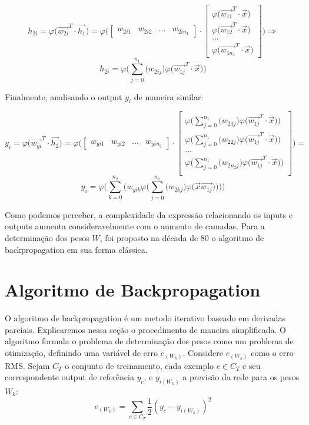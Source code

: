 \documentclass[
	12pt,				%
	oneside,			%
	a4paper,			%
	english,			%
	french,				%
	spanish,			%
	brazil,				%
	]{abntex2}
\begin{document}
$$h_{2i} = \varphi \big( \vec{w_{2i}}^T \cdot \vec{h_1}  ) = 
\varphi \bigg(
\begin{bmatrix}
w_{2i1} & w_{2i2} & ... & w_{2in_1}
\end{bmatrix} \cdot 
\begin{bmatrix}
\varphi \big(\vec{w_{11}}^T \cdot \vec{x} ) \\
\varphi \big(\vec{w_{12}}^T \cdot \vec{x} ) \\

...  \\
\varphi \big(\vec{w_{1n_1}}^T \cdot \vec{x} )
\end{bmatrix} 
\bigg) \Rightarrow
$$
$$ h_{2i} = \varphi \bigg(
\sum_{j = 0}^{n_1} \big(w_{2ij}\big) \varphi \big(\vec{w_{1j}}^T \cdot \vec{x} )  
\bigg) $$

Finalmente, analisando o output $y_i$ de maneira similar:

$$y_i = \varphi \big( \vec{w_{yi}}^T \cdot \vec{h_2}) = 
\varphi \Bigg( \begin{bmatrix}
w_{yi1} & w_{yi2} & ... & w_{yin_2}
\end{bmatrix} \cdot 
\begin{bmatrix}
\varphi \bigg(
\sum_{j = 0}^{n_1} \big(w_{21j}\big)  \varphi \big(\vec{w_{1j}}^T \cdot \vec{x} )\bigg) \\
\varphi \bigg(
\sum_{j = 0}^{n_1}\big( w_{22j}\big)  \varphi \big(\vec{w_{1j}}^T \cdot \vec{x} )\bigg) \\
... \\
\varphi \bigg(
\sum_{j = 0}^{n_1}\big( w_{2n_2j}\big)  \varphi \big(\vec{w_{1j}}^T \cdot \vec{x} ) \bigg) \\
\end{bmatrix} \Bigg) =
$$
$$y_i = \varphi \Bigg( \sum_{k=0}^{n_2}\bigg( 
w_{yik}  \varphi \Big(
\sum_{j = 0}^{n_1}\big( w_{2kj}\big)  \varphi \big( \vec{x}  \vec{w_{1j}} ) \Big) 
\bigg) \Bigg)$$

Como podemos perceber, a complexidade da express\~ao relacionando os inputs e outputs aumenta consideravelmente com o aumento de camadas. Para a determina\c{c}\~ao dos pesos $W$, foi proposto na década de 80 o algoritmo de backpropagation em sua forma clássica.

\section{Algoritmo de Backpropagation}

O algoritmo de backpropagation \'e um metodo iterativo baseado em derivadas parciais. Explicaremos nessa se\c{c}\~ao o procedimento de maneira simplificada. O algoritmo formula o problema de determina\c{c}\~ao dos pesos como um problema de otimiza\c{c}\~ao, definindo uma vari\'avel de erro $e_{(W_k)}$. Considere $e_{(W_k)}$ como o erro RMS. Sejam $C_T$ o conjunto de treinamento, cada exemplo $c \in C_T$ e seu correspondente output de referência $y_c$, e $y_{i(W_k)}$ a previsão da rede para os pesos $W_k$:
$$e_{(W_k)} = \sum_{c \in C_T} \frac{1}{2} (y_{c} - y_{i(W_k)})^2$$
\end{document}
